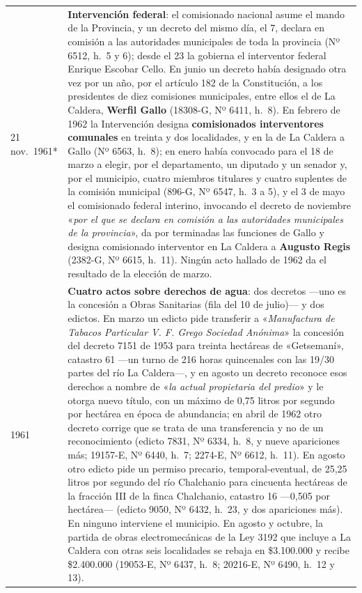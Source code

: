 \begin{longtable}{@{}p{2.7cm}p{10.3cm}@{}}
21 nov.\ 1961* & \textbf{Intervención federal}: el comisionado nacional asume el mando de la Provincia, y un decreto del mismo día, el 7, declara en comisión a las autoridades municipales de toda la provincia (Nº 6512, h.\ 5 y 6); desde el 23 la gobierna el interventor federal Enrique Escobar Cello. En junio un decreto había designado otra vez por un año, por el artículo 182 de la Constitución, a los presidentes de diez comisiones municipales, entre ellos el de La Caldera, \textbf{Werfil Gallo} (18308-G, Nº 6411, h.\ 8). En febrero de 1962 la Intervención designa \textbf{comisionados interventores comunales} en treinta y dos localidades, y en la de La Caldera a Gallo (Nº 6563, h.\ 8); en enero había convocado para el 18 de marzo a elegir, por el departamento, un diputado y un senador y, por el municipio, cuatro miembros titulares y cuatro suplentes de la comisión municipal (896-G, Nº 6547, h.\ 3 a 5), y el 3 de mayo el comisionado federal interino, invocando el decreto de noviembre «\textit{por el que se declara en comisión a las autoridades municipales de la provincia}», da por terminadas las funciones de Gallo y designa comisionado interventor en La Caldera a \textbf{Augusto Regis} (2382-G, Nº 6615, h.\ 11). Ningún acto hallado de 1962 da el resultado de la elección de marzo. \\
1961 & \textbf{Cuatro actos sobre derechos de agua}: dos decretos ---uno es la concesión a Obras Sanitarias (fila del 10 de julio)--- y dos edictos. En marzo un edicto pide transferir a «\textit{Manufactura de Tabacos Particular V. F. Grego Sociedad Anónima}» la concesión del decreto 7151 de 1953 para treinta hectáreas de «Getsemaní», catastro 61 ---un turno de 216 horas quincenales con las 19/30 partes del río La Caldera---, y en agosto un decreto reconoce esos derechos a nombre de «\textit{la actual propietaria del predio}» y le otorga nuevo título, con un máximo de 0,75 litros por segundo por hectárea en época de abundancia; en abril de 1962 otro decreto corrige que se trata de una transferencia y no de un reconocimiento (edicto 7831, Nº 6334, h.\ 8, y nueve apariciones más; 19157-E, Nº 6440, h.\ 7; 2274-E, Nº 6612, h.\ 11). En agosto otro edicto pide un permiso precario, temporal-eventual, de 25,25 litros por segundo del río Chalchanio para cincuenta hectáreas de la fracción III de la finca Chalchanio, catastro 16 ---0,505 por hectárea--- (edicto 9050, Nº 6432, h.\ 23, y dos apariciones más). En ninguno interviene el municipio. En agosto y octubre, la partida de obras electromecánicas de la Ley 3192 que incluye a La Caldera con otras seis localidades se rebaja en \$3.100.000 y recibe \$2.400.000 (19053-E, Nº 6437, h.\ 8; 20216-E, Nº 6490, h.\ 12 y 13). \\

\end{longtable}
